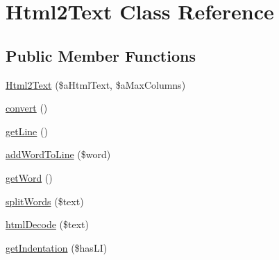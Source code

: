 \hypertarget{classHtml2Text}{\section{Html2\+Text Class Reference}
\label{classHtml2Text}
}
\subsection*{Public Member Functions}
\begin{DoxyCompactItemize}
\item 
\hyperlink{classHtml2Text_a8be1c2ba4a804a6625f77f525474374d}{Html2\+Text} (\$a\+Html\+Text, \$a\+Max\+Columns)
\item 
\hyperlink{classHtml2Text_a180ebdd9fc13fa40484f1140288b1a2d}{convert} ()
\item 
\hyperlink{classHtml2Text_abee419dd36e91f8415e2d05179e4d961}{get\+Line} ()
\item 
\hyperlink{classHtml2Text_a13a652c4a37ee695398eeea16f37594f}{add\+Word\+To\+Line} (\$word)
\item 
\hyperlink{classHtml2Text_ae2d6223263a1adc49c53ec28365ce3ae}{get\+Word} ()
\item 
\hyperlink{classHtml2Text_a706c293a5f628aad44a0bc76e17b9c11}{split\+Words} (\$text)
\item 
\hyperlink{classHtml2Text_ab9a81560284542d868b2947de60e5084}{html\+Decode} (\$text)
\item 
\hyperlink{classHtml2Text_a76c12bc2c8a836b7712affd572955fd5}{get\+Indentation} (\$has\+L\+I)
\end{DoxyCompactItemize}
